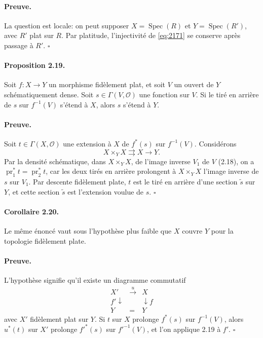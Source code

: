 \documentclass[11pt]{article}
\newcommand{\Spec}{\operatorname{Spec}}
\newcommand{\calO}{\mathcal O}
\DeclareMathOperator{\pr}{pr}
\begin{document}
\paragraph{Preuve.}
La question est locale: on peut supposer $X=\Spec(R)$ et $Y=\Spec(R')$, avec $R'$ plat sur $R$. Par platitude, l'injectivité de \eqref{eq:2171} se conserve après passage à $R'$. \hfill $\square$

\paragraph{Proposition 2.19.}
Soit $f:X\to Y$ un morphisme fidèlement plat, et soit $V$ un ouvert de $Y$ schématiquement dense. Soit $s\in\Gamma(V,\calO)$ une fonction sur $V$. Si le tiré en arrière de $s$ sur $f^{-1}(V)$ s'étend à $X$, alors $s$ s'étend à $Y$.

\paragraph{Preuve.}
Soit $t\in\Gamma(X,\calO)$ une extension à $X$ de $f^*(s)$ sur $f^{-1}(V)$. Considérons
\[
X\times_Y X \rightrightarrows X\longrightarrow Y.
\]
Par la densité schématique, dans $X\times_YX$, de l'image inverse $V_1$ de $V$ (2.18), on a $\pr_1^*t=\pr_2^*t$, car les deux tirés en arrière prolongent à $X\times_YX$ l'image inverse de $s$ sur $V_1$. Par descente fidèlement plate, $t$ est le tiré en arrière d'une section $\widetilde s$ sur $Y$, et cette section $\widetilde s$ est l'extension voulue de $s$. \hfill $\square$

\paragraph{Corollaire 2.20.}
Le même énoncé vaut sous l'hypothèse plus faible que $X$ couvre $Y$ pour la topologie fidèlement plate.

\paragraph{Preuve.}
L'hypothèse signifie qu'il existe un diagramme commutatif
\[
\begin{array}{ccc}
X'&\xrightarrow{u}&X\\
\scriptstyle f'\downarrow&&\downarrow\scriptstyle f\\
Y&=&Y
\end{array}
\]
avec $X'$ fidèlement plat sur $Y$. Si $t$ sur $X$ prolonge $f^*(s)$ sur $f^{-1}(V)$, alors $u^*(t)$ sur $X'$ prolonge $f'^*(s)$ sur $f'^{-1}(V)$, et l'on applique 2.19 à $f'$. \hfill $\square$
\end{document}

